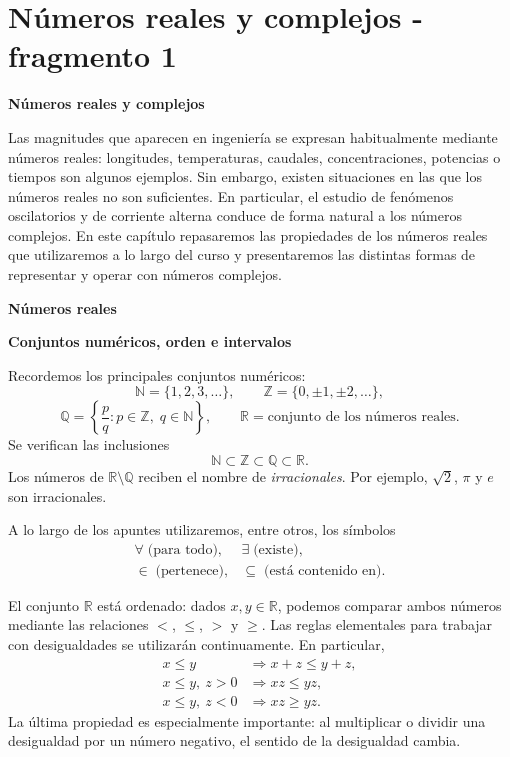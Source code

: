 
\section{Números reales y complejos - fragmento 1}
\textbf{Números reales y complejos}

Las magnitudes que aparecen en ingeniería se expresan habitualmente mediante números reales: longitudes, temperaturas, caudales, concentraciones, potencias o tiempos son algunos ejemplos. Sin embargo, existen situaciones en las que los números reales no son suficientes. En particular, el estudio de fenómenos oscilatorios y de corriente alterna conduce de forma natural a los números complejos. En este capítulo repasaremos las propiedades de los números reales que utilizaremos a lo largo del curso y presentaremos las distintas formas de representar y operar con números complejos.

\textbf{Números reales}

\textbf{Conjuntos numéricos, orden e intervalos}

Recordemos los principales conjuntos numéricos:
\[
\mathbb{N}=\{1,2,3,\ldots\},\qquad
\mathbb{Z}=\{0,\pm1,\pm2,\ldots\},
\]
\[
\mathbb{Q}=\left\{\frac{p}{q}:p\in\mathbb{Z},\;q\in\mathbb{N}\right\},
\qquad
\mathbb{R}=\text{conjunto de los números reales}.
\]
Se verifican las inclusiones
\[
\mathbb{N}\subset\mathbb{Z}\subset\mathbb{Q}\subset\mathbb{R}.
\]
Los números de \(\mathbb{R}\setminus\mathbb{Q}\) reciben el nombre de \emph{irracionales}. Por ejemplo,
\(\sqrt{2}\), \(\pi\) y \(e\) son irracionales.

A lo largo de los apuntes utilizaremos, entre otros, los símbolos
\[
\begin{array}{ll}
\forall\;	\text{(para todo)}, & \exists\;	\text{(existe)},\\[2mm]
\in\;	\text{(pertenece)}, & \subseteq\;	\text{(está contenido en)}.
\end{array}
\]

El conjunto \(\mathbb{R}\) está ordenado: dados \(x,y\in\mathbb{R}\), podemos comparar ambos números mediante las relaciones \(<\), \(\leq\), \(>\) y \(\geq\). Las reglas elementales para trabajar con desigualdades se utilizarán continuamente. En particular,
\begin{align*}
 x\leq y &\Longrightarrow x+z\leq y+z,\\
 x\leq y,\ z>0 &\Longrightarrow xz\leq yz,\\
 x\leq y,\ z<0 &\Longrightarrow xz\geq yz.
\end{align*}
La última propiedad es especialmente importante: al multiplicar o dividir una desigualdad por un número negativo, el sentido de la desigualdad cambia.


